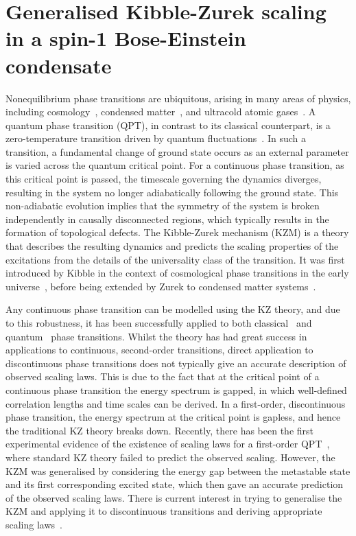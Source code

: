 \chapter{\label{chap: spin-1}Generalised Kibble-Zurek scaling in a spin-1
Bose-Einstein condensate}

Nonequilibrium phase transitions are ubiquitous, arising in many areas of
physics, including cosmology~\cite{Kibble1980,Mazumdar2019}, condensed
matter~\cite{Chuang1991,Hendry1994,Bauerle1996,Ruutu1996,Sondhi1997,
Polkovnikov2011}, and ultracold atomic gases~\cite{Hadzibabic2006,Langen2015,
Fletcher2015,Liu2018}.
A quantum phase transition (QPT), in contrast to its classical counterpart, is a
zero-temperature transition driven by quantum fluctuations~\cite{Sachdev2011}.
In such a transition, a fundamental change of ground state occurs as an external
parameter is varied across the quantum critical point.
For a continuous phase transition, as this critical point is passed, the
timescale governing the dynamics diverges, resulting in the system no longer
adiabatically following the ground state.
This non-adiabatic evolution implies that the symmetry of the system is broken
independently in causally disconnected regions, which typically results in the
formation of topological defects.
The Kibble-Zurek mechanism (KZM) is a theory that describes the resulting
dynamics and predicts the scaling properties of the excitations from the details
of the universality class of the transition.
It was first introduced by Kibble in the context of cosmological phase
transitions in the early universe~\cite{Kibble1976, Kibble1980}, before being
extended by Zurek to condensed matter systems~\cite{Zurek1985, Zurek1993,
    Zurek1996}.

Any continuous phase transition can be modelled using the KZ theory, and due to
this robustness, it has been successfully applied to both
classical~\cite{Donadello2016,Beugnon2017} and
quantum~\cite{Dziarmaga2005, Damski2005, Lamacraft2007} phase transitions.
Whilst the theory has had great success in applications to continuous,
second-order transitions, direct application to discontinuous phase transitions
does not typically give an accurate description of observed scaling laws.
This is due to the fact that at the critical point of a continuous phase
transition the energy spectrum is gapped, in which well-defined correlation
lengths and time scales can be derived.
In a first-order, discontinuous phase transition, the energy spectrum at the
critical point is gapless, and hence the traditional KZ theory breaks down.
Recently, there has been the first experimental evidence of the existence of
scaling laws for a first-order QPT~\cite{Qiu2020}, where standard KZ theory
failed to predict the observed scaling.
However, the KZM was generalised by considering the energy gap between the
metastable state and its first corresponding excited state, which then gave an
accurate prediction of the observed scaling laws.
There is current interest in trying to generalise the KZM and applying it to
discontinuous transitions and deriving appropriate scaling
laws~\cite{Divakaran2008, Suzuki2015}.

